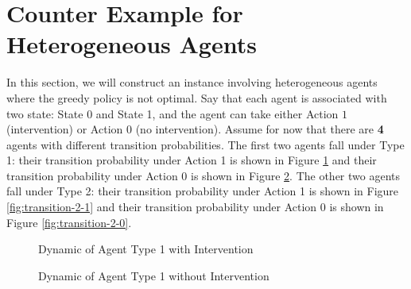 \section{Counter Example for Heterogeneous Agents}\label{sec:counter-example-heterogeneous}
In this section, we will construct an instance involving heterogeneous agents where the greedy policy is not optimal. Say that each agent is associated with two state: State 0 and State 1, and the agent can
take either Action $1$ (intervention) or Action $0$ (no intervention). Assume for now that there are \textbf{4} agents with different transition probabilities. 
The first two agents fall under Type 1:
their transition probability under Action 1 is shown in Figure \ref{fig:transition-1-1} 
and their transition probability under Action 0
is shown in Figure \ref{fig:transition-1-0}. 
The other two agents fall under Type 2:
their transition probability under Action 1
is shown in Figure \ref{fig:transition-2-1} and their transition probability under Action 0 
is shown in Figure \ref{fig:transition-2-0}. 
\begin{figure}[!h]
\centering
{}
\caption{Dynamic of Agent Type 1 with Intervention}
\label{fig:transition-1-1}
\end{figure}
\begin{figure}[!h]
\centering
{}
\caption{Dynamic of Agent Type 1 without Intervention}
\label{fig:transition-1-0}
\end{figure}
